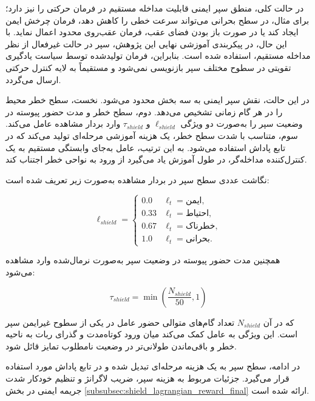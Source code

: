 در حالت کلی، منطق سپر ایمنی قابلیت مداخله مستقیم در فرمان حرکتی را نیز دارد؛ برای مثال، در سطح بحرانی می‌تواند سرعت خطی را کاهش دهد، فرمان چرخش ایمن ایجاد کند یا در صورت باز بودن فضای عقب، فرمان عقب‌روی محدود اعمال نماید. با این حال، در پیکربندی آموزشی نهایی این پژوهش، سپر در حالت غیرفعال از نظر مداخله مستقیم، استفاده شده است. بنابراین، فرمان تولیدشده توسط سیاست یادگیری تقویتی در سطوح مختلف سپر بازنویسی نمی‌شود و مستقیماً به لایه کنترل حرکتی ارسال می‌گردد.

در این حالت، نقش سپر ایمنی به سه بخش محدود می‌شود. نخست، سطح خطر محیط را در هر گام زمانی تشخیص می‌دهد. دوم، سطح خطر و مدت حضور پیوسته در وضعیت سپر را به‌صورت دو ویژگی \(\ell_{shield}\) و \(\tau_{shield}\) وارد بردار مشاهده عامل می‌کند. سوم، متناسب با شدت سطح خطر، یک هزینه آموزشی مرحله‌ای تولید می‌کند که در تابع پاداش استفاده می‌شود. به این ترتیب، عامل به‌جای وابستگی مستقیم به یک کنترل‌کننده مداخله‌گر، در طول آموزش یاد می‌گیرد از ورود به نواحی خطر اجتناب کند.

نگاشت عددی سطح سپر در بردار مشاهده به‌صورت زیر تعریف شده است:

\begin{equation}
	\ell_{shield} =
	\begin{cases}
		0.0 & \ell_t=\text{ایمن},\\
		0.33 & \ell_t=\text{احتیاط},\\
		0.67 & \ell_t=\text{خطرناک},\\
		1.0 & \ell_t=\text{بحرانی}.
	\end{cases}
	\label{eq:shield_level_encoding_final}
\end{equation}

همچنین مدت حضور پیوسته در وضعیت سپر به‌صورت نرمال‌شده وارد مشاهده می‌شود:

\begin{equation}
	\tau_{shield} =
	\min
	\left(
	\frac{N_{shield}}{50},
	1
	\right)
	\label{eq:shield_duration_encoding_final}
\end{equation}

که در آن \(N_{shield}\) تعداد گام‌های متوالی حضور عامل در یکی از سطوح غیرایمن سپر است. این ویژگی به عامل کمک می‌کند میان ورود کوتاه‌مدت و گذرای ربات به ناحیه خطر و باقی‌ماندن طولانی‌تر در وضعیت نامطلوب تمایز قائل شود.

در ادامه، سطح سپر به یک هزینه مرحله‌ای تبدیل شده و در تابع پاداش مورد استفاده قرار می‌گیرد. جزئیات مربوط به هزینه سپر، ضریب لاگرانژ
 و تنظیم خودکار شدت جریمه ایمنی در بخش \ref{subsubsec:shield_lagrangian_reward_final} ارائه شده است.

